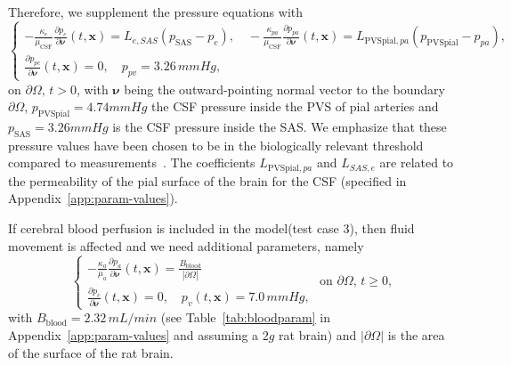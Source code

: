 \documentclass[a4paper,11pt]{article}
\newcommand{\1}{^{(1)}}
\newcommand{\2}{^{(2)}}
\newcommand{\abs}[1]{\left\lvert#1\right\rvert}
\begin{document}
Therefore, we supplement the pressure equations with
\begin{equation}
\begin{cases}
    - \frac{\kappa_e}{\mu_\text{CSF}}\frac{\partial p_e}{\partial \pmb{\nu}}(t,\mathbf{x}) = L_{e , SAS}(p_\text{SAS}-p_{e}),\quad -\frac{\kappa_{pa}}{\mu_\text{CSF}}\frac{\partial p_{pa}}{\partial \pmb{ \nu}}(t,\mathbf x)  = L_{\text{PVSpial},pa}(p_{\text{PVSpial}}-p_{pa}), \\
    \frac{\partial p_{pc}}{\partial \pmb{\nu}}(t,\mathbf x) = 0, \quad p_{pv} = 3.26\, \si{mmHg},  %
\end{cases}
\label{eq:BC-4compsPVS}
\end{equation}
$\text{on } \partial \Omega,\, t>0$, with $\pmb{\nu}$ being the outward-pointing normal vector to the boundary $\partial \Omega$, ${p_\text{PVSpial} = 4.74\si{mmHg} }$ the CSF pressure inside the PVS of pial arteries and ${p_\text{SAS} = 3.26 \si{mmHg} }$ is the CSF pressure inside the SAS. 
We emphasize that these pressure values have been chosen to be in the biologically relevant threshold compared to measurements~\cite{Roy-rat-pressure-2013}.
The coefficients $L_{\text{PVSpial}, pa}$ and $L_{SAS, e}$ are related to the permeability of the pial surface of the brain for the CSF (specified in Appendix~\ref{app:param-values}).

If cerebral blood perfusion is included in the model(test case 3), then fluid movement is affected and we need additional parameters, namely
\begin{equation}
\begin{cases}
    -\frac{\kappa_{a}}{\mu_{a}}\frac{\partial p_{a}}{\partial \pmb{\nu}}(t,\mathbf x)  = \frac{B_\text{blood}}{\abs{\partial \Omega}} \\
    \frac{\partial p_{c}}{\partial \pmb{\nu}}(t,\mathbf x) = 0, \quad p_{v}(t,\mathbf x) = 7.0\, \si{mmHg}, 
\end{cases}
\text{ on } \partial \Omega, \, t\ge 0,
    \label{eq:BC-4compsblood}
\end{equation}
with $B_\text{blood} = 2.32 \, \si{mL/min}$ (see Table~\ref{tab:bloodparam} in Appendix~\ref{app:param-values} and assuming a $2\si{g}$ rat brain) and $\abs{\partial \Omega}$ is the area of the surface of the rat brain.
\end{document}
